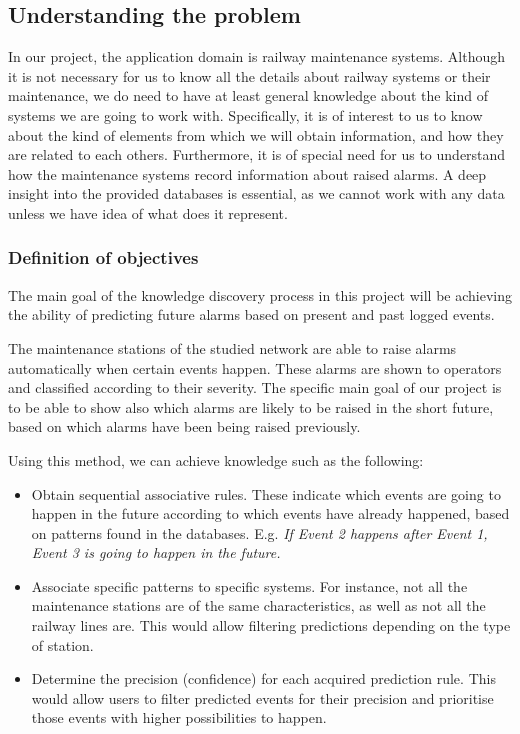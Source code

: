 \subsection{Understanding the problem}
In our project, the application domain is railway maintenance systems. Although it is not necessary for us to know all the details about railway systems or their maintenance, we do need to have at least general knowledge about the kind of systems we are going to work with. Specifically, it is of interest to us to know about the kind of elements from which we will obtain information, and how they are related to each others. Furthermore, it is of special need for us to understand how the maintenance systems record information about raised alarms. A deep insight into the provided databases is essential, as we cannot work with any data unless we have idea of what does it represent.

\subsubsection*{Definition of objectives}
The main goal of the knowledge discovery process in this project will be achieving the ability of predicting future alarms based on present and past logged events.

The maintenance stations of the studied network are able to raise alarms automatically when certain events happen. These alarms are shown to operators and classified according to their severity. The specific main goal of our project is to be able to show also which alarms are likely to be raised in the short future, based on which alarms have been being raised previously.

Using this method, we can achieve knowledge such as the following:
\begin{itemize}
 \item Obtain sequential associative rules. These indicate which events are going to happen in the future according to which events have already happened, based on patterns found in the databases. E.g. \textit{If Event 2 happens after Event 1, Event 3 is going to happen in the future.}
 \item Associate specific patterns to specific systems. For instance, not all the maintenance stations are of the same characteristics, as well as not all the railway lines are. This would allow filtering predictions depending on the type of station.
 \item Determine the precision (confidence) for each acquired prediction rule. This would allow users to filter predicted events for their precision and prioritise those events with higher possibilities to happen.
\end{itemize}

